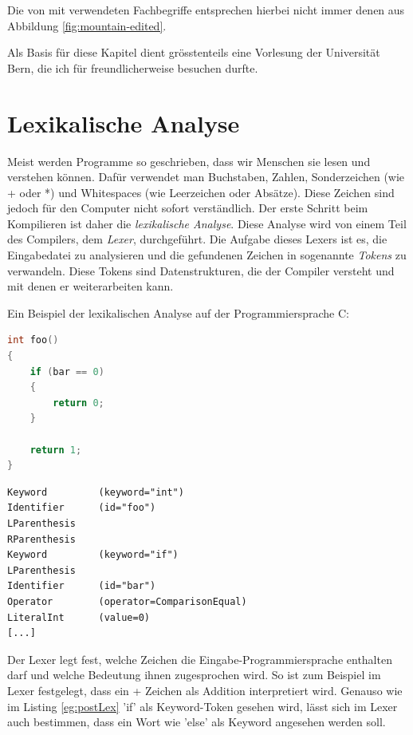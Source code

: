 Die von mit verwendeten Fachbegriffe entsprechen hierbei nicht immer denen aus Abbildung \ref{fig:mountain-edited}.

Als Basis für diese Kapitel dient grösstenteils eine Vorlesung der Universität Bern, die ich für freundlicherweise besuchen durfte.

\section{Lexikalische Analyse}
Meist werden Programme so geschrieben, dass wir Menschen sie lesen und verstehen können. Dafür verwendet man Buchstaben, Zahlen, Sonderzeichen (wie + oder *) und Whitespaces (wie Leerzeichen oder Absätze).
Diese Zeichen sind jedoch für den Computer nicht sofort verständlich. Der erste Schritt beim Kompilieren ist daher die \textit{lexikalische Analyse}. Diese Analyse wird von einem Teil des Compilers, dem \textit{Lexer}, durchgeführt.
Die Aufgabe dieses Lexers ist es, die Eingabedatei zu analysieren und die gefundenen Zeichen in sogenannte \textit{Tokens} zu verwandeln. Diese Tokens sind Datenstrukturen, die der Compiler versteht und mit denen er weiterarbeiten kann.

Ein Beispiel der lexikalischen Analyse auf der Programmiersprache C:

\begin{lstlisting}[language=C, label=eg:preLex, caption=C code vor der lexikalischen Analyse]
int foo()
{
    if (bar == 0)
    {
        return 0;
    }

    return 1;
}
\end{lstlisting}

\begin{lstlisting}[label=eg:postLex, caption=Tokens nach der lexikalische Analyse]
Keyword         (keyword="int")
Identifier      (id="foo")
LParenthesis
RParenthesis
Keyword         (keyword="if")
LParenthesis
Identifier      (id="bar")
Operator        (operator=ComparisonEqual)
LiteralInt      (value=0)
[...]
\end{lstlisting}

Der Lexer legt fest, welche Zeichen die Eingabe-Programmiersprache enthalten darf und welche Bedeutung ihnen zugesprochen wird. So ist zum Beispiel im Lexer festgelegt, dass ein + Zeichen als Addition interpretiert wird.
Genauso wie im Listing \ref{eg:postLex} {\listingFont\selectfont 'if'} als Keyword-Token gesehen wird, lässt sich im Lexer auch bestimmen, dass ein Wort wie {\listingFont\selectfont 'else'} als Keyword angesehen werden soll.


